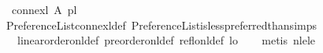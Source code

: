 \begin{isabellebody}
\ \ \ {\isachardoublequoteopen}connex{\isacharunderscore}{\kern0pt}l\ A\ pl{\isachardoublequoteclose}\isanewline
%
\isadelimproof
\ \ %
\endisadelimproof
%
\isatagproof
{}\isamarkupfalse%
\ \ Preference{\isacharunderscore}{\kern0pt}List{\isachardot}{\kern0pt}connex{\isacharunderscore}{\kern0pt}l{\isacharunderscore}{\kern0pt}def\ Preference{\isacharunderscore}{\kern0pt}List{\isachardot}{\kern0pt}is{\isacharunderscore}{\kern0pt}less{\isacharunderscore}{\kern0pt}preferred{\isacharunderscore}{\kern0pt}than{\isachardot}{\kern0pt}simps\ \isanewline
\ \ \ \ linear{\isacharunderscore}{\kern0pt}order{\isacharunderscore}{\kern0pt}on{\isacharunderscore}{\kern0pt}l{\isacharunderscore}{\kern0pt}def\ preorder{\isacharunderscore}{\kern0pt}on{\isacharunderscore}{\kern0pt}l{\isacharunderscore}{\kern0pt}def\ refl{\isacharunderscore}{\kern0pt}on{\isacharunderscore}{\kern0pt}l{\isacharunderscore}{\kern0pt}def\ lo\isanewline
\ \ \isamarkupfalse%
\ {\isacharparenleft}{\kern0pt}metis\ nle{\isacharunderscore}{\kern0pt}le{\isacharparenright}{\kern0pt}%
\endisatagproof
{\isafoldproof}%
%
\isadelimproof
\isanewline
%
\endisadelimproof
%
\isadelimtheory
\ \ \isanewline
%
\endisadelimtheory
%
\isatagtheory
{}\isamarkupfalse%
%
\endisatagtheory
{\isafoldtheory}%
%
\isadelimtheory
%
\endisadelimtheory
%
\end{isabellebody}%
\endinput
